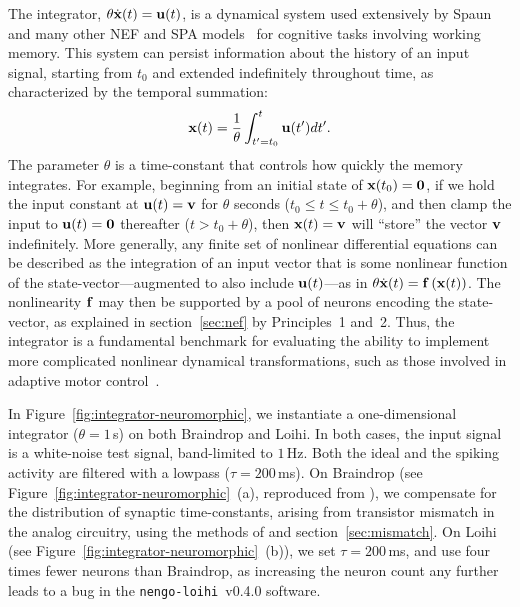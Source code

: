 The integrator, $\theta \dot{\mathbf{x}}(t) = \mathbf{u}(t)$, is a dynamical system used extensively by Spaun~\citep{eliasmith2012} and many other NEF and SPA models~\citep[][to name a few]{singh2004, trujillo2014a, rasmussen2017} for cognitive tasks involving working memory.
This system can persist information about the history of an input signal, starting from $t_0$ and extended indefinitely throughout time, as characterized by the temporal summation:
$$\mathbf{x}(t) = \frac{1}{\theta} \int_{t'=t_0}^{t} \mathbf{u}(t') dt' \text{.}$$
The parameter $\theta$ is a time-constant that controls how quickly the memory integrates.
For example, beginning from an initial state of $\mathbf{x}(t_0) = \mathbf{0}$, if we hold the input constant at $\mathbf{u}(t) = \mathbf{v}$ for $\theta$ seconds ($t_0 \le t \le t_0 + \theta$), and then clamp the input to $\mathbf{u}(t) = \mathbf{0}$ thereafter ($t > t_0 + \theta$), then $\mathbf{x}(t) = \mathbf{v}$ will ``store'' the vector $\mathbf{v}$ indefinitely.
More generally, any finite set of nonlinear differential equations can be described as the integration of an input vector that is some nonlinear function of the state-vector---augmented to also include $\mathbf{u}(t)$---as in $\theta \dot{\mathbf{x}}(t) = \mathbf{f}\left({\mathbf{x}(t)}\right)$.
The nonlinearity $\mathbf{f}$ may then be supported by a pool of neurons encoding the state-vector, as explained in section~\ref{sec:nef} by Principles~1 and~2.
Thus, the integrator is a fundamental benchmark for evaluating the ability to implement more complicated nonlinear dynamical transformations, such as those involved in adaptive motor control~\citep{dewolf2016}.

In Figure~\ref{fig:integrator-neuromorphic}, we instantiate a one-dimensional integrator ($\theta = 1$\,s) on both Braindrop and Loihi.
In both cases, the input signal is a white-noise test signal, band-limited to $1$\,Hz.
Both the ideal and the spiking activity are filtered with a lowpass ($\tau = 200$\,ms).
On Braindrop (see Figure~\ref{fig:integrator-neuromorphic}~(a), reproduced from \citet[][Figure~15]{braindrop2019}), we compensate for the distribution of synaptic time-constants, arising from transistor mismatch in the analog circuitry, using the methods of \citet{voelker2017iscas} and section~\ref{sec:mismatch}.
On Loihi (see Figure~\ref{fig:integrator-neuromorphic}~(b)), we set $\tau = 200$\,ms, and use four times fewer neurons than Braindrop, as increasing the neuron count any further leads to a bug in the \texttt{nengo-loihi}~v0.4.0 software.


